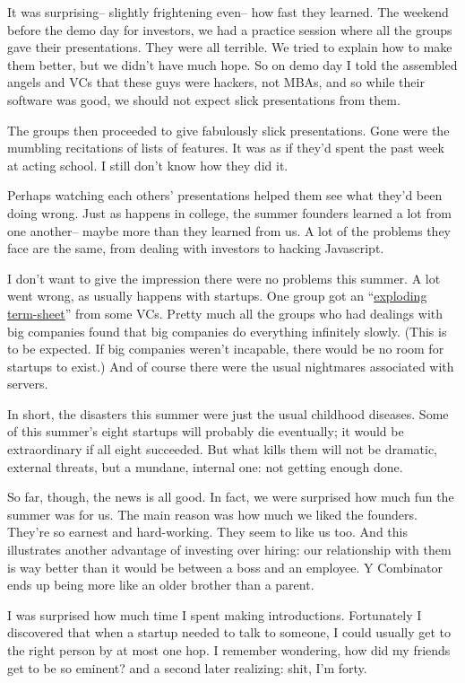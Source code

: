 \documentclass[12pt]{book}
\begin{document}
It was surprising-- slightly frightening even-- how fast they learned.
The weekend before the demo day for investors, we had a practice session
where all the groups gave their presentations. They were all terrible.
We tried to explain how to make them better, but we didn't have much
hope. So on demo day I told the assembled angels and VCs that these guys
were hackers, not MBAs, and so while their software was good, we should
not expect slick presentations from them.

The groups then proceeded to give fabulously slick presentations. Gone
were the mumbling recitations of lists of features. It was as if they'd
spent the past week at acting school. I still don't know how they did
it.

Perhaps watching each others' presentations helped them see what they'd
been doing wrong. Just as happens in college, the summer founders
learned a lot from one another-- maybe more than they learned from us. A
lot of the problems they face are the same, from dealing with investors
to hacking Javascript.

I don't want to give the impression there were no problems this summer.
A lot went wrong, as usually happens with startups. One group got an
``\href{http://www.ventureblog.com/articles/indiv/2003/000024.html}{exploding
term-sheet}'' from some VCs. Pretty much all the groups who had dealings
with big companies found that big companies do everything infinitely
slowly. (This is to be expected. If big companies weren't incapable,
there would be no room for startups to exist.) And of course there were
the usual nightmares associated with servers.

In short, the disasters this summer were just the usual childhood
diseases. Some of this summer's eight startups will probably die
eventually; it would be extraordinary if all eight succeeded. But what
kills them will not be dramatic, external threats, but a mundane,
internal one: not getting enough done.

So far, though, the news is all good. In fact, we were surprised how
much fun the summer was for us. The main reason was how much we liked
the founders. They're so earnest and hard-working. They seem to like us
too. And this illustrates another advantage of investing over hiring:
our relationship with them is way better than it would be between a boss
and an employee. Y Combinator ends up being more like an older brother
than a parent.

I was surprised how much time I spent making introductions. Fortunately
I discovered that when a startup needed to talk to someone, I could
usually get to the right person by at most one hop. I remember
wondering, how did my friends get to be so eminent? and a second later
realizing: shit, I'm forty.
\end{document}
